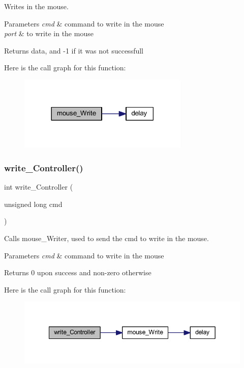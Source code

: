 Writes in the mouse. 


\begin{DoxyParams}{Parameters}
{\em cmd} & command to write in the mouse \\
\hline
{\em port} & to write in the mouse \\
\hline
\end{DoxyParams}
\begin{DoxyReturn}{Returns}
data, and -\/1 if it was not successfull 
\end{DoxyReturn}
Here is the call graph for this function\+:
\nopagebreak
\begin{figure}[H]
\begin{center}
\leavevmode
\includegraphics[width=230pt]{group___mouse_gae7c331cf6f4c63d80b6bce11c2c8e771_cgraph}
\end{center}
\end{figure}
\mbox{\label{group___mouse_ga4f52e05e730b3482a7b249d818b816b1}} 
\subsubsection{\texorpdfstring{write\+\_\+\+Controller()}{write\_Controller()}}
{\footnotesize\ttfamily int write\+\_\+\+Controller (\begin{DoxyParamCaption}\item[{unsigned long}]{cmd }\end{DoxyParamCaption})}



Calls mouse\+\_\+\+Writer, used to send the cmd to write in the mouse. 


\begin{DoxyParams}{Parameters}
{\em cmd} & command to write in the mouse \\
\hline
\end{DoxyParams}
\begin{DoxyReturn}{Returns}
0 upon success and non-\/zero otherwise 
\end{DoxyReturn}
Here is the call graph for this function\+:
\nopagebreak
\begin{figure}[H]
\begin{center}
\leavevmode
\includegraphics[width=349pt]{group___mouse_ga4f52e05e730b3482a7b249d818b816b1_cgraph}
\end{center}
\end{figure}
